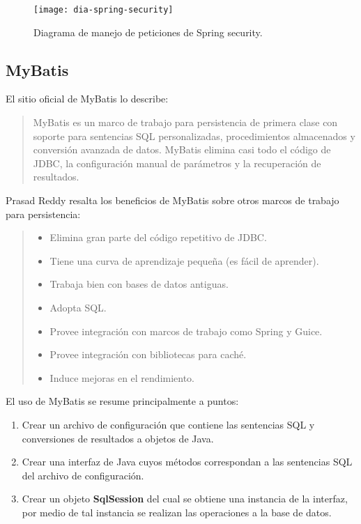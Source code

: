\begin{figure}[h]
	\centering
	\texttt{[image: dia-spring-security]}
	\caption{Diagrama de manejo de peticiones de Spring security\cite{ProSpringSecurity}.}
	\label{fig:dia-spring-security}
\end{figure}

\subsection{MyBatis}\label{sec:mybatis}
El sitio oficial de MyBatis\cite{MyBatis} lo describe: 
\begin{quote}
MyBatis es un marco de trabajo para persistencia de primera clase con soporte para sentencias SQL personalizadas, procedimientos almacenados y conversión avanzada de datos. MyBatis elimina casi todo el código de JDBC, la configuración manual de parámetros y la recuperación de resultados.
\end{quote}

Prasad Reddy\cite{PersistenceWithMyBatis} resalta los beneficios de MyBatis sobre otros marcos de trabajo para persistencia:
\begin{quote}
	\begin{itemize}
		\item Elimina gran parte del código repetitivo de JDBC.
		\item Tiene una curva de aprendizaje pequeña (es fácil de aprender).
		\item Trabaja bien con bases de datos antiguas.
		\item Adopta SQL.
		\item Provee integración con marcos de trabajo como Spring y Guice.
		\item Provee integración con bibliotecas para caché.
		\item Induce mejoras en el rendimiento.
	\end{itemize}
\end{quote}

El uso de MyBatis se resume principalmente a puntos\cite{PersistenceWithMyBatis}:
\begin{enumerate}
	\item Crear un archivo de configuración que contiene las sentencias SQL y conversiones de resultados a objetos de Java.
	\item Crear una interfaz de Java cuyos métodos correspondan a las sentencias SQL del archivo de configuración.
	\item Crear un objeto \textbf{SqlSession} del cual se obtiene una instancia de la interfaz, por medio de tal instancia se realizan las operaciones a la base de datos.
\end{enumerate}

